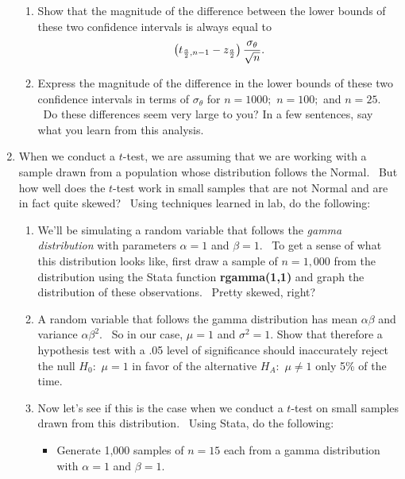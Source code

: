 \documentclass[11pt]{article}
\begin{document}
\begin{enumerate}
\begin{enumerate}
\item Show that the magnitude of the difference between the lower bounds of
these two confidence intervals is always equal to%
\begin{equation*}
\left( t_{\frac{a}{2},n-1}-z_{\frac{a}{2}}\right) \frac{\sigma _{\theta }}{%
\sqrt{n}}.
\end{equation*}

\item Express the magnitude of the difference in the lower bounds of these
two confidence intervals in terms of $\sigma _{\theta }$ for $n=1000;$ $%
n=100;$ and $n=25.$ \  Do these differences seem very large to you? In a few
sentences, say what you learn from this analysis.\medskip 
\end{enumerate}

\item When we conduct a $t$-test, we are assuming that we are working with a
sample drawn from a population whose distribution follows the Normal. \ But
how well does the $t$-test work in small samples that are not Normal and are
in fact quite skewed? \ Using techniques learned in lab, do the following:

\begin{enumerate}
\item We'll be simulating a random variable that follows the \textit{gamma
distribution} with parameters $\alpha =1$ and $\beta =1.$ \ To get a sense
of what this distribution looks like, first draw a sample of $n=1,000$ from
the distribution using the Stata function \textbf{rgamma(1,1) }and graph the
distribution of these observations. \ Pretty skewed, right?

\item A random variable that follows the gamma distribution has mean $\alpha
\beta $ and variance $\alpha \beta ^{2}.$ \ So in our case, $\mu =1$ and $%
\sigma ^{2}=1.$ Show that therefore a hypothesis test with a .05 level of
significance should inaccurately reject the null $H_{0}:$ $\mu =1$ in favor
of the alternative $H_{A}:$ $\mu \neq 1$ only 5\% of the time. \ 

\item Now let's see if this is the case when we conduct a $t$-test on small
samples drawn from this distribution. \ Using Stata, do the following:

\begin{itemize}
\item Generate 1,000 samples of $n=15$ each from a gamma distribution with $%
\alpha =1$ and $\beta =1.$


\end{itemize}
\end{enumerate}
\end{enumerate}
\end{document}
